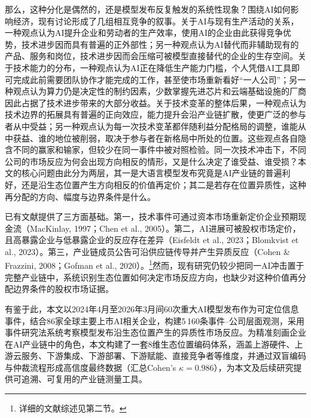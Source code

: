 \documentclass[11pt,fontset=fandol,a4paper]{ctexart}
\newcommand{\changed}[1]{{\color{orange!85!black}#1}}
\begin{document}
\changed{那么，这种分化是偶然的，还是模型发布反复触发的系统性现象？围绕AI如何影响经济，现有讨论形成了几组相互竞争的叙事。关于AI与现有生产活动的关系，一种观点认为AI提升企业和劳动者的生产效率，使用AI的企业由此获得竞争优势，技术进步因而具有普遍的正外部性；另一种观点认为AI替代而非辅助现有的产品、服务和岗位，技术进步因而会压缩可被模型直接替代的企业的生存空间。关于技术能力的分布，一种观点认为AI正在降低生产能力门槛，个人凭借AI工具即可完成此前需要团队协作才能完成的工作，甚至使市场重新看好“一人公司”；另一种观点认为算力仍是决定性的制约因素，少数掌握先进芯片和云端基础设施的厂商因此占据了技术进步带来的大部分收益。关于技术变革的整体后果，一种观点认为技术边界的拓展具有普遍的正向效应，能力提升会沿产业链扩散，使更广泛的参与者从中受益；另一种观点认为每一次技术变革都伴随利益分配格局的调整，谁能从中获益、谁的地位被削弱，取决于参与者在新格局中所处的位置。这些观点各自隐含不同的赢家和输家，但较少在同一事件中被对照检验。同一次技术冲击下，不同公司的市场反应为何会出现方向相反的情形，又是什么决定了谁受益、谁受损？本文的核心问题由此分为两层，其一是大语言模型发布究竟是AI产业链的普遍利好，还是沿生态位置产生方向相反的价值再定价；其二是若存在位置异质性，这种再分配的方向、幅度与边界条件是什么。}

\changed{已有文献提供了三方面基础。第一，技术事件可通过资本市场重新定价企业预期现金流（MacKinlay, 1997；Chen et al., 2005）。第二，AI进展可被股权市场定价，且高暴露企业与低暴露企业的反应存在差异（Eisfeldt et al., 2023；Blomkvist et al., 2023）。第三，产业链成员公告可沿供应链传导并产生异质反应（Cohen \& Frazzini, 2008；Gofman et al., 2020）。\footnote{详细的文献综述见第二节。}然而，现有研究仍较少把同一AI冲击置于完整产业链中，系统识别生态位置如何决定市场反应方向，也缺少对这种价值再分配边界条件的股权市场证据。}

\changed{有鉴于此，本文以2024年4月至2026年3月间60次重大AI模型发布作为可定位信息事件，结合86家全球主要上市AI相关企业，构建5\,160条事件--公司层面观测，采用事件研究法系统考察模型发布沿生态位置产生的异质性市场反应。为精准刻画企业在AI产业链中的角色，本文构建了一套8维生态位置编码体系，涵盖上游硬件、上游云服务、下游集成、下游部署、下游赋能、直接竞争者等维度，并通过双盲编码与仲裁流程形成高信度最终数据（汇总Cohen's $\kappa=0.986$），为本文及后续研究提供可追溯、可复用的产业链测量工具。}
\end{document}
